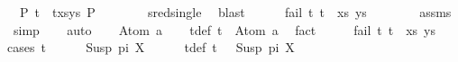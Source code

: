 \begin{isabellebody}
\ {\isachardoublequoteopen}{\isasymexists}\ P{}{\isachardot}{\kern0pt}\ {\isacharparenleft}{\kern0pt}{\isacharparenleft}{\kern0pt}t{}\ {\isasymapprox}{\isacharquery}{\kern0pt}\ t{}{\isacharparenright}{\kern0pt}{\isacharhash}{\kern0pt}xs{\isacharcomma}{\kern0pt}ys{\isacharparenright}{\kern0pt}\ {\isasymTurnstile}{\isacharparenleft}{\kern0pt}{\isacharbraceleft}{\kern0pt}{\isacharbraceright}{\kern0pt}{\isacharcomma}{\kern0pt}{\isacharbrackleft}{\kern0pt}{\isacharbrackright}{\kern0pt}{\isacharparenright}{\kern0pt}{\isasymRightarrow}P{}{\isachardoublequoteclose}\isanewline
\ \ \ \ \ \ \isamarkupfalse%
\ sred{\isacharunderscore}{\kern0pt}single\ \isamarkupfalse%
\ blast\isanewline
\ \ \ \ \isamarkupfalse%
\ {\isachardoublequoteopen}fail\ {\isacharparenleft}{\kern0pt}{\isacharparenleft}{\kern0pt}t{}{\isacharcomma}{\kern0pt}\ t{}{\isacharparenright}{\kern0pt}\ {\isacharhash}{\kern0pt}\ xs{\isacharcomma}{\kern0pt}\ ys{\isacharparenright}{\kern0pt}{\isachardoublequoteclose}\isanewline
\ \ \ \ \ \ \isamarkupfalse%
\ assms\ \isamarkupfalse%
\ simp\isanewline
\ \ \isamarkupfalse%
\ {\isacharparenleft}{\kern0pt}auto{\isacharparenright}{\kern0pt}\isanewline
{}\isamarkupfalse%
\isanewline
\ \ \isamarkupfalse%
\ {\isacharparenleft}{\kern0pt}Atom\ a{\isacharparenright}{\kern0pt}\isanewline
\ \ \isamarkupfalse%
\ t{}{\isacharunderscore}{\kern0pt}def{\isacharcolon}{\kern0pt}\ {\isachardoublequoteopen}t{}\ {\isacharequal}{\kern0pt}\ Atom\ a{\isachardoublequoteclose}\ \isamarkupfalse%
\ fact\isanewline
\ \ \isamarkupfalse%
\ \isamarkupfalse%
\ {\isachardoublequoteopen}fail\ {\isacharparenleft}{\kern0pt}{\isacharparenleft}{\kern0pt}t{}{\isacharcomma}{\kern0pt}\ t{}{\isacharparenright}{\kern0pt}\ {\isacharhash}{\kern0pt}\ xs{\isacharcomma}{\kern0pt}\ ys{\isacharparenright}{\kern0pt}{\isachardoublequoteclose}\ \isanewline
\ \ \isamarkupfalse%
{\isacharparenleft}{\kern0pt}cases\ t{}{\isacharparenright}{\kern0pt}\isanewline
\ \ \ \ \isamarkupfalse%
\ {\isacharparenleft}{\kern0pt}Susp\ pi\ X{\isacharparenright}{\kern0pt}\isanewline
\ \ \ \ \isamarkupfalse%
\ t{}{\isacharunderscore}{\kern0pt}def{\isacharcolon}{\kern0pt}\ {\isachardoublequoteopen}t{}\ {\isacharequal}{\kern0pt}\ \ Susp\ pi\ X{\isachardoublequoteclose}\ \isamarkupfalse%

\end{isabellebody}
